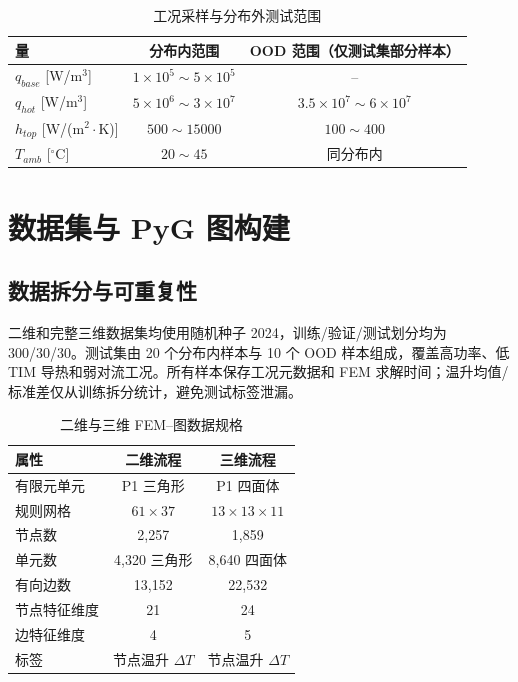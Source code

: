 \documentclass[11pt,a4paper]{article}
\newcommand{\dT}{\Delta T}
\begin{document}
\begin{table}[H]
\centering
\caption{工况采样与分布外测试范围}
\label{tab:ranges}
\begin{tabular}{lcc}
\toprule
量 & 分布内范围 & OOD 范围（仅测试集部分样本） \\
\midrule
$q_{base}$ [W/m$^3$] & $1\times10^5\sim5\times10^5$ & -- \\
$q_{hot}$ [W/m$^3$] & $5\times10^6\sim3\times10^7$ & $3.5\times10^7\sim6\times10^7$ \\
$h_{top}$ [W/(m$^2\cdot$K)] & $500\sim15000$ & $100\sim400$ \\
$T_{amb}$ [$^\circ$C] & $20\sim45$ & 同分布内 \\
\bottomrule
\end{tabular}
\end{table}

\section{数据集与 PyG 图构建}

\subsection{数据拆分与可重复性}
二维和完整三维数据集均使用随机种子 2024，训练/验证/测试划分均为 300/30/30。测试集由 20 个分布内样本与 10 个 OOD 样本组成，覆盖高功率、低 TIM 导热和弱对流工况。所有样本保存工况元数据和 FEM 求解时间；温升均值/标准差仅从训练拆分统计，避免测试标签泄漏。

\begin{table}[H]
\centering
\caption{二维与三维 FEM--图数据规格}
\label{tab:graph-spec}
\begin{tabular}{lcc}
\toprule
属性 & 二维流程 & 三维流程 \\
\midrule
有限元单元 & P1 三角形 & P1 四面体 \\
规则网格 & $61\times37$ & $13\times13\times11$ \\
节点数 & 2,257 & 1,859 \\
单元数 & 4,320 三角形 & 8,640 四面体 \\
有向边数 & 13,152 & 22,532 \\
节点特征维度 & 21 & 24 \\
边特征维度 & 4 & 5 \\
标签 & 节点温升 $\dT$ & 节点温升 $\dT$ \\
\bottomrule
\end{tabular}
\end{table}
\end{document}
